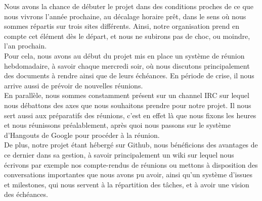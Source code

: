 Nous avons la chance de débuter le projet dans des conditions proches de ce que nous vivrons l'année prochaine, au décalage horaire prêt, dans le sens où nous sommes répartis sur trois sites différents. Ainsi, notre organisation prend en compte cet élément dès le départ, et nous ne subirons pas de choc, ou moindre, l'an prochain.\\

Pour cela, nous avons au début du projet mis en place un système de réunion hebdomadaire, à savoir chaque mercredi soir, où nous discutons principalement des documents à rendre ainsi que de leurs échéances. En période de crise, il nous arrive aussi de prévoir de nouvelles réunions.\\

En parallèle, nous sommes constamment présent sur un channel IRC sur lequel nous débattons des axes que nous souhaitons prendre pour notre projet. Il nous sert aussi aux préparatifs des réunions, c'est en effet là que nous fixons les heures et nous réunissons préalablement, après quoi nous passons sur le système d'Hangouts de Google pour procéder à la réunion.\\

De plus, notre projet étant hébergé sur Github, nous bénéficions des avantages de ce dernier dans sa gestion, à savoir principalement un wiki sur lequel nous écrivons par exemple nos compte-rendus de réunions ou mettons à disposition des conversations importantes que nous avons pu avoir, ainsi qu'un système d'issues et milestones, qui nous servent à la répartition des tâches, et à avoir une vision des échéances.
